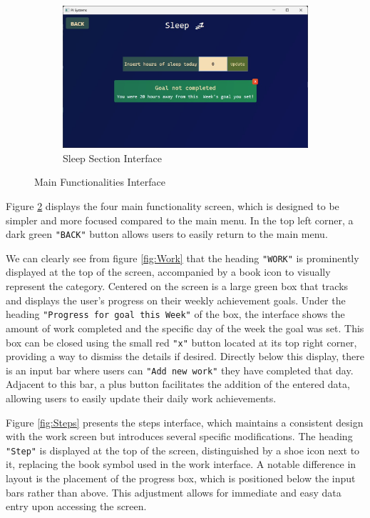 \documentclass[12pt]{article}
\begin{document}
\begin{figure}[h!]
  \begin{subfigure}{0.4\linewidth}
    \includegraphics[width = \linewidth]{Sleep Screen}
    \caption{Sleep Section Interface}
    \label{fig:Sleep}
  \end{subfigure}

  \caption{Main Functionalities Interface}
  \label{fig:Main}
\end{figure}

Figure \ref{fig:Main} displays the four main functionality screen, which is designed
to be simpler and more focused compared to the main menu. In the top left corner, a 
dark green \texttt{"BACK"} button allows users to easily return to the main menu.\par 

We can clearly see from figure \ref{fig:Work} that the heading \texttt{"WORK"} is prominently 
displayed at the top of the screen, accompanied by a book icon to visually represent 
the category. Centered on the screen is a large green box that tracks and displays the
user's progress on their weekly achievement goals. Under the heading \texttt{"Progress for goal
this Week"} of the box, the interface shows the amount of work completed and the specific
day of the week the goal was set. This box can be closed using the small red \texttt{"x"} button
located at its top right corner, providing a way to dismiss the details if desired.
Directly below this display, there is an input bar where users can \texttt{"Add new work"} they 
have completed that day. Adjacent to this bar, a plus button facilitates the addition 
of the entered data, allowing users to easily update their daily work achievements.\par

Figure \ref{fig:Steps} presents the steps interface, which maintains a consistent design
with the work screen but introduces several specific modifications. The heading \texttt{"Step"} is
displayed at the top of the screen, distinguished by a shoe icon next to it, replacing the
book symbol used in the work interface. A notable difference in layout is the placement of
the progress box, which is positioned below the input bars rather than above. This adjustment
allows for immediate and easy data entry upon accessing the screen.\par
\end{document}

